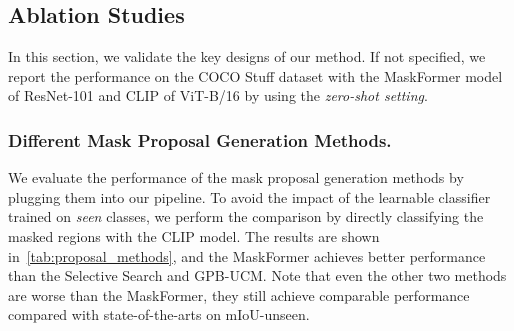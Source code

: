\documentclass[runningheads]{llncs}
\begin{document}
\subsection{Ablation Studies}
In this section, we validate the key designs of our method. If not specified, we report the performance on the COCO Stuff dataset with the MaskFormer model of ResNet-101 and CLIP of ViT-B/16 by using the \emph{zero-shot setting}.

\subsubsection{Different Mask Proposal Generation Methods.}
We evaluate the performance of the mask proposal generation methods by plugging them into our pipeline. To avoid the impact of the learnable classifier trained  on \emph{seen} classes, we perform the comparison by directly classifying the masked regions with the CLIP model. The results are shown in~\cref{tab:proposal_methods}, and the MaskFormer achieves better performance than the Selective Search and GPB-UCM. Note that even the other two methods are worse than the MaskFormer, they still achieve comparable performance compared with state-of-the-arts on mIoU-unseen.
\end{document}
